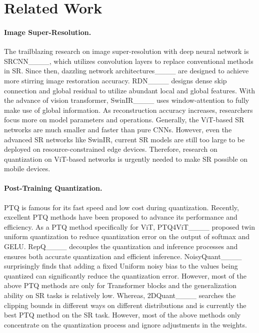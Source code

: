 \section{Related Work}
\vspace{-2mm}
\paragraph{Image Super-Resolution.}
The trailblazing research on image super-resolution with deep neural network is SRCNN____, which utilizes convolution layers to replace conventional methods in SR.
Since then, dazzling network architectures____ are designed to achieve more stirring image restoration accuracy.
RDN____ designs dense skip connection and global residual to utilize abundant local and global features.
With the advance of vision transformer, SwinIR____ uses window-attention to fully make use of global information.
As reconstruction accuracy increases, researchers focus more on model parameters and operations.
Generally, the ViT-based SR networks are much smaller and faster than pure CNNs.
However, even the advanced SR networks like SwinIR, current SR models are still too large to be deployed on resource-constrained edge devices.
Therefore, research on quantization on ViT-based networks is urgently needed to make SR possible on mobile devices.

\vspace{-4mm}
\paragraph{Post-Training Quantization.}
PTQ is famous for its fast speed and low cost during quantization.
Recently, excellent PTQ methods have been proposed to advance its performance and efficiency.
As a PTQ method specifically for ViT, PTQ4ViT____ proposed twin uniform quantization to reduce quantization error on the output of softmax and GELU.
RepQ____ decouples the quantization and inference processes and ensures both accurate quantization and efficient inference.
NoisyQuant____ surprisingly finds that adding a fixed Uniform noisy bias to the values being quantized can significantly reduce the quantization error.
However, most of the above PTQ methods are only for Transformer blocks and the generalization ability on SR tasks is relatively low.
Whereas, 
2DQuant____ searches the clipping bounds in different ways on different distributions and is currently the best PTQ method on the SR task.
However, most of the above methods only concentrate on the quantization process and ignore adjustments in the weights. 

